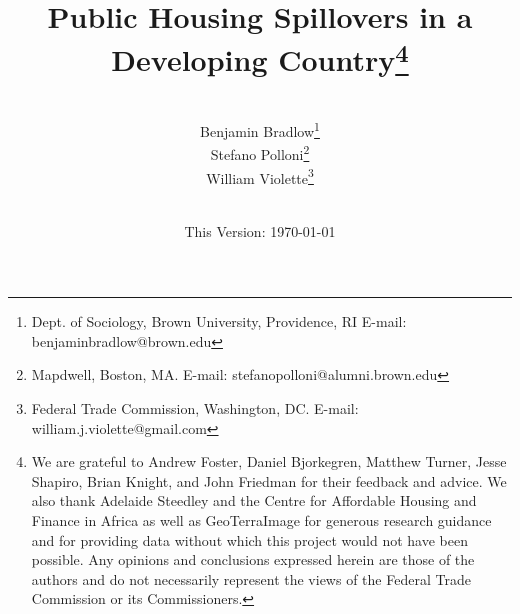 \documentclass[12pt]{article}
\begin{document}
\begin{titlepage} 
\title{{Public Housing Spillovers in a Developing Country}\thanks{We are grateful to Andrew Foster, Daniel Bjorkegren, Matthew Turner, Jesse Shapiro, Brian Knight, and John Friedman for their feedback and advice.  We also thank Adelaide Steedley and the Centre for Affordable Housing and Finance in Africa as well as GeoTerraImage for generous research guidance and for providing data without which this project would not have been possible.  Any opinions and conclusions expressed herein are those of the authors and do not necessarily represent the views of the Federal Trade Commission or its Commissioners.}}
\author{\\[3em] Benjamin Bradlow\thanks{Dept. of Sociology, Brown University, Providence, RI  E-mail: benjamin\textunderscore bradlow@brown.edu}\\
 Stefano Polloni\thanks{Mapdwell, Boston, MA.  E-mail: stefano\textunderscore polloni@alumni.brown.edu}\\ 
  William Violette\thanks{Federal Trade Commission, Washington, DC. E-mail: william.j.violette@gmail.com} \\
 \\ 
  }
\date{\vspace{5mm}This Version: \today}
\maketitle
\begin{abstract}









\end{abstract}
\end{titlepage}
\end{document}
